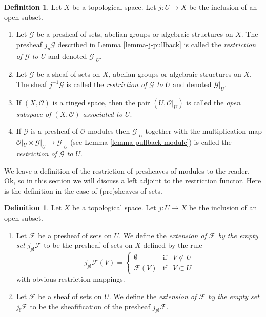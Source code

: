 \documentclass{stacks-project}
\theoremstyle{plain}
\theoremstyle{definition}
\newtheorem{definition}[subsection]{Definition}
\theoremstyle{remark}
\numberwithin{equation}{subsection}
\begin{document}
\begin{definition}
\label{definition-restriction}
Let $X$ be a topological space.
Let $j : U \to X$ be the inclusion of an open subset.
\begin{enumerate}
\item Let $\mathcal{G}$ be a presheaf of sets, abelian groups or
algebraic structures on $X$. The presheaf $j_p\mathcal{G}$ described
in Lemma \ref{lemma-j-pullback} is called
the {\it restriction of $\mathcal{G}$ to $U$} and denoted $\mathcal{G}|_U$.
\item Let $\mathcal{G}$ be a sheaf of sets on $X$, abelian groups or
algebraic structures on $X$. The sheaf $j^{-1}\mathcal{G}$ is called
the {\it restriction of $\mathcal{G}$ to $U$} and denoted $\mathcal{G}|_U$.
\item If $(X, \mathcal{O})$ is a ringed space, then the pair
$(U, \mathcal{O}|_U)$ is called the
{\it open subspace of $(X, \mathcal{O})$ associated to $U$}.
\item If $\mathcal{G}$ is a presheaf of $\mathcal{O}$-modules
then $\mathcal{G}|_U$ together with the multiplication map
$\mathcal{O}|_U \times \mathcal{G}|_U \to \mathcal{G}|_U$
(see Lemma \ref{lemma-pullback-module})
is called the {\it restriction of $\mathcal{G}$ to $U$}.
\end{enumerate}
\end{definition}

\noindent
We leave a definition of the restriction of presheaves
of modules to the reader. Ok, so in this section we will
discuss a left adjoint to the restriction functor.
Here is the definition in the case of (pre)sheaves
of sets.

\begin{definition}
\label{definition-j-shriek}
Let $X$ be a topological space.
Let $j : U \to X$ be the inclusion of an open subset.
\begin{enumerate}
\item Let $\mathcal{F}$ be a presheaf of sets on $U$. We define
the {\it extension of $\mathcal{F}$ by the empty set $j_{p!}\mathcal{F}$}
to be the presheaf of sets on $X$ defined by the rule
$$
j_{p!}\mathcal{F}(V) =
\left\{
\begin{matrix}
\emptyset & \text{if} & V \not \subset U \\
\mathcal{F}(V) & \text{if} & V \subset U
\end{matrix}
\right.
$$
with obvious restriction mappings.
\item Let $\mathcal{F}$ be a sheaf of sets on $U$. We define
the {\it extension of $\mathcal{F}$ by the empty set $j_!\mathcal{F}$}
to be the sheafification of the presheaf $j_{p!}\mathcal{F}$.
\end{enumerate}
\end{definition}
\end{document}
